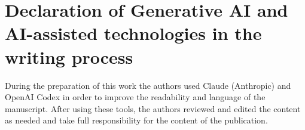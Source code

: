 \documentclass[preprint,12pt]{elsarticle}
\begin{document}
\section*{Declaration of Generative AI and AI-assisted technologies in the writing process}
During the preparation of this work the authors used Claude (Anthropic) and OpenAI Codex in order to improve the readability and language of the manuscript. After using these tools, the authors reviewed and edited the content as needed and take full responsibility for the content of the publication.

\setlength{\bibsep}{4pt}


\end{document}

